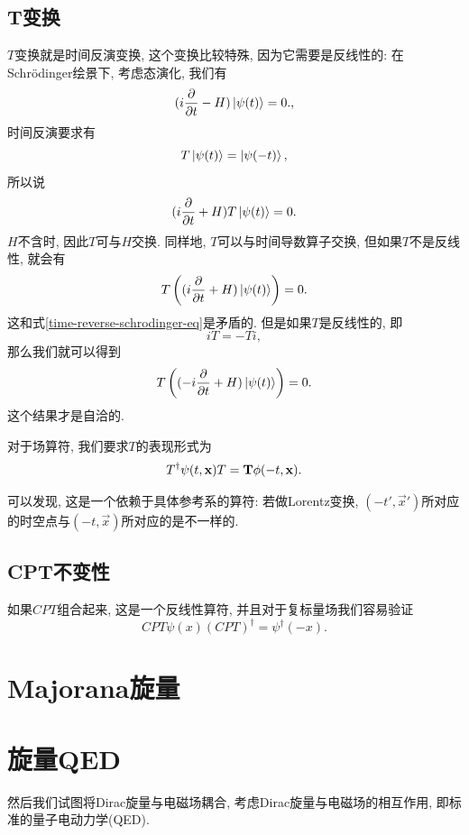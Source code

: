 \subsection{T变换}
$T$变换就是时间反演变换, 这个变换比较特殊, 因为它需要是反线性的: 在Schrödinger绘景下, 考虑态演化, 我们有
\begin{equation}
    (i\pa{}t-H)\ket{\psi(t)}=0.\label{time-reverse-schrodinger-eq},
\end{equation}
时间反演要求有
\begin{equation}
    T\ket{\psi(t)}=\ket{\psi(-t)},
\end{equation}
所以说
\begin{equation}
    (i\pa{}t+H)T\ket{\psi(t)}=0.
\end{equation}
$H$不含时, 因此$T$可与$H$交换. 同样地, $T$可以与时间导数算子交换, 但如果$T$不是反线性, 就会有
\begin{equation}
    T\left((i\pa{}t+H)\ket{\psi(t)}\right)=0.
\end{equation}
这和式\eqref{time-reverse-schrodinger-eq}是矛盾的. 但是如果$T$是反线性的, 即
\begin{equation}
    iT=-Ti,
\end{equation}
那么我们就可以得到
\begin{equation}
    T\left((-i\pa{}t+H)\ket{\psi(t)}\right)=0.
\end{equation}
这个结果才是自洽的.

对于场算符, 我们要求$T$的表现形式为
\begin{equation}
    T^\dagger\psi(t, \vec x)T=\boldsymbol{\rm T}\phi(-t, \vec x).
\end{equation}

可以发现, 这是一个依赖于具体参考系的算符: 若做Lorentz变换, $(-t', \vec x')$所对应的时空点与$(-t, \vec x)$所对应的是不一样的.

\subsection{CPT不变性}
如果$CPT$组合起来, 这是一个反线性算符, 并且对于复标量场我们容易验证
\begin{equation}
    CPT\psi(x)(CPT)^\dagger=\psi^\dagger(-x).
\end{equation}

\section{Majorana旋量}


\newpage
\section{旋量QED}
然后我们试图将Dirac旋量与电磁场耦合, 考虑Dirac旋量与电磁场的相互作用, 即标准的量子电动力学(QED).
